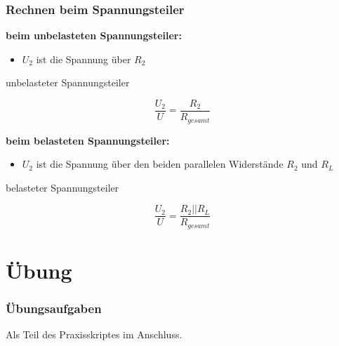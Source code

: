 \begin{frame}
  \frametitle{Rechnen beim Spannungsteiler}
  \textbf{beim unbelasteten Spannungsteiler:}
  \begin{itemize}
    \item $U_2$ ist die Spannung über $R_2$
  \end{itemize}
  \begin{block}{unbelasteter Spannungsteiler}
    \begin{center}
      $$\frac{U_2}{U} = \frac{R_2}{R_{gesamt}}$$
    \end{center}
  \end{block}

  \textbf{beim belasteten Spannungsteiler:}
  \begin{itemize}
    \item $U_2$ ist die Spannung über den beiden parallelen Widerstände $R_2$ und $R_L$
  \end{itemize}
  \begin{block}{belasteter Spannungsteiler}
    \begin{center}
      $$\frac{U_2}{U} = \frac{R_{2}||R_{L}}{R_{gesamt}}$$
    \end{center}
  \end{block}
\end{frame}

\section{Übung}

\begin{frame}
  \frametitle{Übungsaufgaben}

  Als Teil des Praxisskriptes im Anschluss.

\end{frame}

